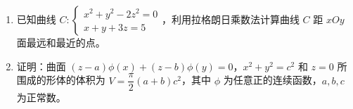 \documentclass[12pt,a4paper]{article}
\begin{document}
\begin{enumerate}[label=\arabic*、, itemsep=2em]
    \item 已知曲线 \(C:\begin{cases} x^{2} + y^{2} - 2z^{2} = 0 \\ x + y + 3z = 5 \end{cases}\)，利用拉格朗日乘数法计算曲线 \(C\) 距 \(xOy\) 面最远和最近的点。

    \item 证明：曲面 \((z-a)\phi(x) + (z-b)\phi(y) = 0\)，\(x^{2} + y^{2} = c^{2}\) 和 \(z = 0\) 所围成的形体的体积为 \(V = \dfrac{\pi}{2}(a+b)c^{2}\)，其中 \(\phi\) 为任意正的连续函数，\(a,b,c\) 为正常数。
\end{enumerate}
\end{document}
